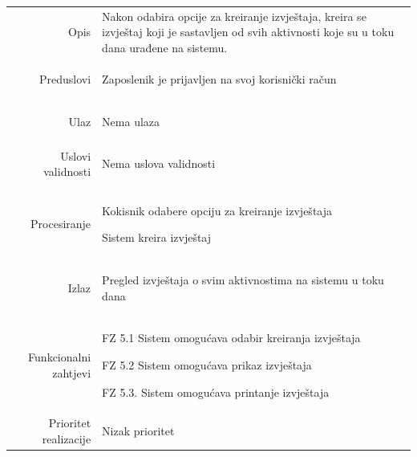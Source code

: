 \documentclass[]{report}
\begin{document}
\begin{tabular}{rp{}}
Opis & 
\hspace{12pt} Nakon odabira opcije za kreiranje izvještaja, kreira se izvještaj koji je sastavljen od svih aktivnosti koje su u toku dana urađene na sistemu.

\\
Preduslovi & 
\begin{compactitem}
    \item Zaposlenik je prijavljen na svoj korisnički račun  
\end{compactitem}

\\
Ulaz &
 
\begin{compactitem}
   \item Nema ulaza
\end{compactitem}
 
\\
Uslovi validnosti &
 
\begin{compactitem}
       \item Nema uslova validnosti
\end{compactitem}
\\


\\
Procesiranje &

\begin{compactitem} 
    \item Kokisnik odabere opciju za kreiranje izvještaja
    \item Sistem kreira izvještaj
\end{compactitem}

\\
Izlaz &

\begin{compactitem} 
    \item Pregled izvještaja o svim aktivnostima na sistemu u toku dana
\end{compactitem}

\\
Funkcionalni zahtjevi &

\begin{compactitem} 
    \item FZ 5.1 Sistem omogućava odabir kreiranja izvještaja
    \item FZ 5.2 Sistem omogućava prikaz izvještaja
    \item FZ 5.3. Sistem omogućava printanje izvještaja
\end{compactitem}

\\
Prioritet realizacije &
\hspace{12pt} Nizak prioritet
\\
\end{tabular}
\end{document}
